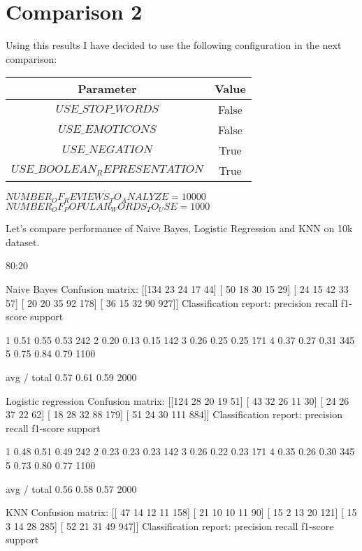 \documentclass[12pt]{report}
\begin{document}
\newpage


\section{Comparison 2}

Using this results I have decided to use the following configuration in the next comparison:

\begin{center}
	\begin{tabular}{ c | c }
		\hline
		Parameter & Value \\ \hline
		$USE\_STOP\_WORDS$ & False \\ \hline
		$USE\_EMOTICONS$ & False \\ \hline
		$USE\_NEGATION$ & True \\ \hline
		$USE\_BOOLEAN_REPRESENTATION$ & True \\ \hline
	\end{tabular}
\end{center}

$NUMBER_OF_REVIEWS_TO_ANALYZE = 10000$
$NUMBER_OF_POPULAR_WORDS_TO_USE = 1000$

Let’s compare performance of Naive Bayes, Logistic Regression and KNN on 10k dataset.


80:20

Naive Bayes
Confusion matrix:
[[134  23  24  17  44]
[ 50  18  30  15  29]
[ 24  15  42  33  57]
[ 20  20  35  92 178]
[ 36  15  32  90 927]]
Classification report:
precision    recall  f1-score   support

1       0.51      0.55      0.53       242
2       0.20      0.13      0.15       142
3       0.26      0.25      0.25       171
4       0.37      0.27      0.31       345
5       0.75      0.84      0.79      1100

avg / total       0.57      0.61      0.59      2000

Logistic regression
Confusion matrix:
[[124  28  20  19  51]
[ 43  32  26  11  30]
[ 24  26  37  22  62]
[ 18  28  32  88 179]
[ 51  24  30 111 884]]
Classification report:
precision    recall  f1-score   support

1       0.48      0.51      0.49       242
2       0.23      0.23      0.23       142
3       0.26      0.22      0.23       171
4       0.35      0.26      0.30       345
5       0.73      0.80      0.77      1100

avg / total       0.56      0.58      0.57      2000

KNN
Confusion matrix:
[[ 47  14  12  11 158]
[ 21  10  10  11  90]
[ 15   2  13  20 121]
[ 15   3  14  28 285]
[ 52  21  31  49 947]]
Classification report:
precision    recall  f1-score   support
\end{document}
